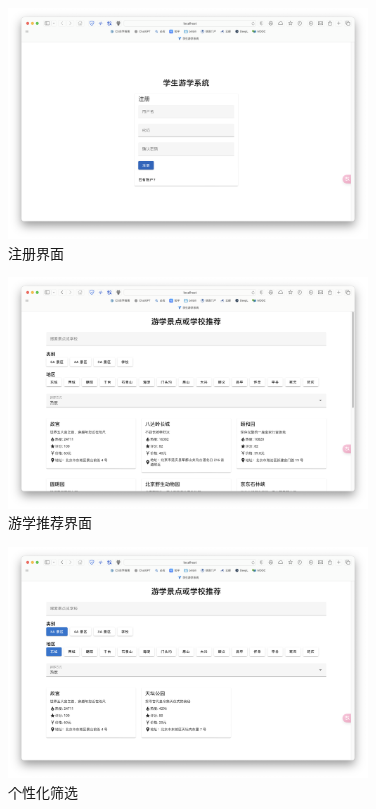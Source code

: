 \documentclass{ctexart}
\begin{document}
\begin{figure}[htbp]
    \centering
    \includegraphics[width=0.85\textwidth]{figure/regist.png}
    \caption{注册界面}
\end{figure}

\begin{figure}[htbp]
    \centering
    \includegraphics[width=0.85\textwidth]{figure/recommand.png}
    \caption{游学推荐界面}
\end{figure}

\begin{figure}[htbp]
    \centering
    \includegraphics[width=0.85\textwidth]{figure/sort.png}
    \caption{个性化筛选}
\end{figure}
\end{document}
